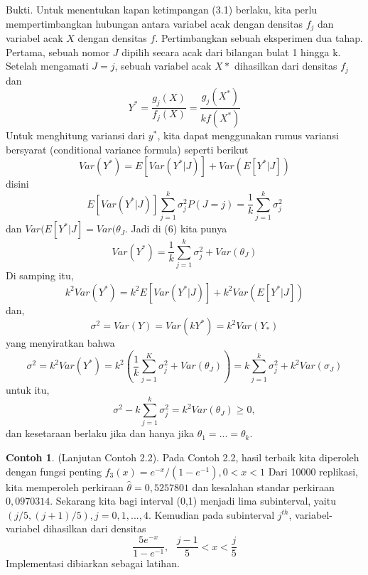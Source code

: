 \documentclass[a4paper,12pt]{article}
\theoremstyle{definition}
\newtheorem{example}{Contoh}[section]
\begin{document}
Bukti. Untuk menentukan kapan ketimpangan (3.1) berlaku, kita perlu mempertimbangkan hubungan antara variabel acak dengan densitas $f_{j}$ dan variabel acak $X$ dengan densitas $f$.
Pertimbangkan sebuah eksperimen dua tahap. Pertama, sebuah nomor $J$ dipilih secara acak dari bilangan bulat 1 hingga k. Setelah mengamati $J = j$, sebuah variabel acak $X*$ dihasilkan dari densitas $f_{j}$ dan
\begin{equation*}
    Y^{*}=\frac{g_{j}(X)}{f_{j}(X)}=\frac{g_{j}(X^{*})}{kf(X^{*})}
\end{equation*}
Untuk menghitung variansi dari $y^{*}$, kita dapat menggunakan rumus variansi bersyarat (conditional variance formula) seperti berikut
\begin{equation}
    Var(Y^{*})=E[Var(Y^{*}|J)]+Var(E[Y^{*}|J])
\end{equation}
disini 
\begin{equation*}
    E[Var(Y^{*}|J)]\sum_{j=1}^{k}\sigma^{2}_{j}P(J=j)=\frac{1}{k}\sum_{j=1}^{k}\sigma^{2}_{j}
\end{equation*}
dan $Var(E[Y^{*}|J]=Var(\theta_{J}$. Jadi di (6) kita punya
\begin{equation*}
    Var(Y^{*})=\frac{1}{k}\sum_{j=1}^{k}\sigma^{2}_{j}+Var(\theta_{J})
\end{equation*}
Di samping itu,
\begin{equation*}
    k^{2}Var(Y^{*})=k^{2}E[Var(Y^{*}|J)]+k^{2}Var(E[Y^{*}|J])
\end{equation*}
dan, 
\begin{equation*}
    \sigma^{2}=Var(Y)=Var(kY^{*})=k^{2}Var(Y_{*})
\end{equation*}
yang menyiratkan bahwa
\begin{equation*}
    \sigma^{2}=k^{2}Var(Y^{*})=k^{2}\left ( \frac{1}{k}\sum_{j=1}^{K}\sigma^{2}_{j}+Var(\theta_{J}) \right )=k\sum_{j=1}^{k}\sigma^{2}_{j}+k^{2}Var(\sigma_{J})
\end{equation*}
untuk itu,
\begin{equation*}
    \sigma^{2}-k\sum_{j=1}^{k}\sigma^{2}_{j}=k^{2}Var(\theta_{J})\geq 0,
\end{equation*}
dan kesetaraan berlaku jika dan hanya jika $\theta_{1}=...=\theta_{k}$.
\begin{example}
    (Lanjutan Contoh 2.2). Pada Contoh 2.2, hasil terbaik kita diperoleh dengan fungsi penting $f_{3}(x)=e^{-x}/(1-e^{-1}),0<x<1$ Dari 10000 replikasi, kita memperoleh perkiraan $\widehat{\theta} = 0,5257801$ dan kesalahan standar perkiraan $0,0970314$. Sekarang kita bagi interval (0,1) menjadi lima subinterval, yaitu $(j/5,(j + 1)/5), j = 0, 1, . . . , 4$. 
    Kemudian pada subinterval $j^{th}$, variabel-variabel dihasilkan dari densitas
    \begin{equation*}
        \frac{5e^{-x}}{1-e^{-1}}, \ \ \ \frac{j-1}{5}<x<\frac{j}{5}
    \end{equation*}
    Implementasi dibiarkan sebagai latihan.
\end{example}




\newpage
\printbibliography[heading=bibintoc,title={Daftar Pustaka}]
\end{document}
